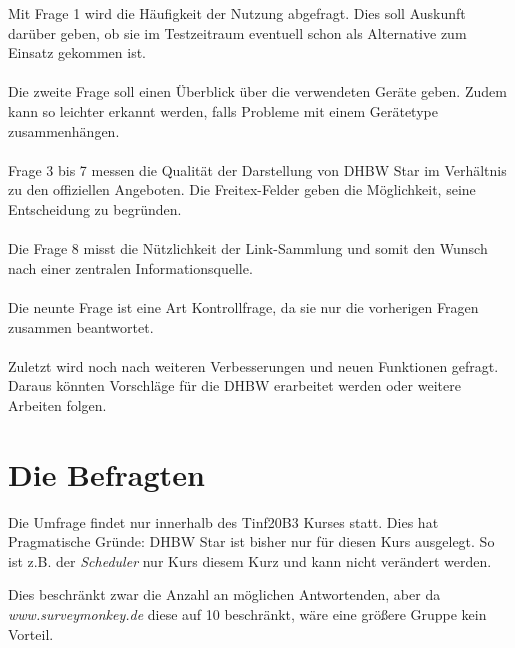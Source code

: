 Mit Frage 1 wird die Häufigkeit der Nutzung abgefragt. Dies soll Auskunft darüber geben, ob sie im Testzeitraum eventuell schon als Alternative zum Einsatz gekommen ist.
\\\\
Die zweite Frage soll einen Überblick über die verwendeten Geräte geben. Zudem kann so leichter erkannt werden, falls Probleme mit einem Gerätetype zusammenhängen.
\\\\
Frage 3 bis 7 messen die Qualität der Darstellung von DHBW Star im Verhältnis zu den offiziellen Angeboten. Die Freitex-Felder geben die Möglichkeit, seine Entscheidung zu begründen.
\\\\
Die Frage 8 misst die Nützlichkeit der Link-Sammlung und somit den Wunsch nach einer zentralen Informationsquelle.
\\\\
Die neunte Frage ist eine Art Kontrollfrage, da sie nur die vorherigen Fragen zusammen beantwortet.
\\\\
Zuletzt wird noch nach weiteren Verbesserungen und neuen Funktionen gefragt. Daraus könnten Vorschläge für die DHBW erarbeitet werden oder weitere Arbeiten folgen.

\section{Die Befragten}
Die Umfrage findet nur innerhalb des Tinf20B3 Kurses statt. Dies hat Pragmatische Gründe: DHBW Star ist bisher nur für diesen Kurs ausgelegt. So ist z.B. der \emph{Scheduler} nur Kurs diesem Kurz und kann nicht verändert werden.

Dies beschränkt zwar die Anzahl an möglichen Antwortenden, aber da \emph{www.surveymonkey.de} diese auf 10 beschränkt, wäre eine größere Gruppe kein Vorteil.